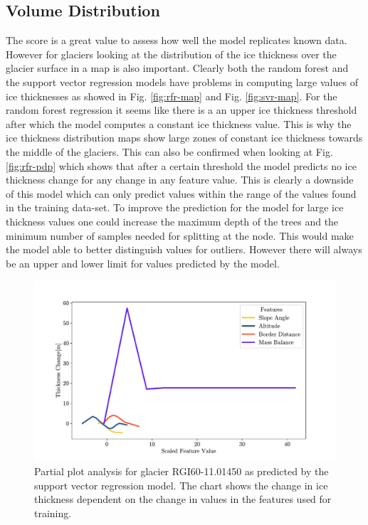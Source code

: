 \subsection{Volume Distribution}\label{disc-vol-dist}
The score is a great value to assess how well the model replicates known data. However for glaciers looking at the distribution of the ice thickness over the glacier surface in a map is also important. Clearly both the random forest and the support vector regression models have problems in computing large values of ice thicknesses as showed in Fig. \ref{fig:rfr-map} and Fig. \ref{fig:svr-map}. For the random forest regression it seems like there is a an upper ice thickness threshold after which the model computes a constant ice thickness value. This is why the ice thickness distribution maps show large zones of constant ice thickness towards the middle of the glaciers. This can also be confirmed when looking at Fig. \ref{fig:rfr-pdp} which shows that after a certain threshold the model predicts no ice thickness change for any change in any feature value. This is clearly a downside of this model which can only predict values within the range of the values found in the training data-set. To improve the prediction for the model for large ice thickness values one could increase the maximum depth of the trees and the minimum number of samples needed for splitting at the node. This would make the model able to better distinguish values for outliers. However there will always be an upper and lower limit for values predicted by the model.

\begin{figure}[!tp]
	\centering		  
	\includegraphics[width=1.\textwidth]{figures/SVR_low_thick_pdp.pdf}
	\caption{Partial plot analysis for glacier RGI60-11.01450 as predicted by the support vector regression model. The chart shows the change in ice thickness dependent on the change in values in the features used for training.}
	\label{fig:svr-pdp-low-thick}
\end{figure}

